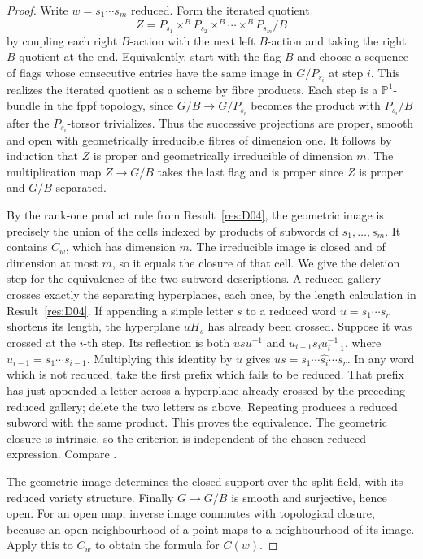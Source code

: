 \documentclass[11pt,a4paper,openany,oneside]{book}
\theoremstyle{resultstyle}
\theoremstyle{definition}
\numberwithin{equation}{chapter}
\begin{document}
\begin{proof}
Write \(w=s_1\cdots s_m\) reduced. Form the iterated quotient
\[
  Z=P_{s_1}\times^B P_{s_2}\times^B\cdots\times^B P_{s_m}/B
\]
by coupling each right \(B\)-action with the next left \(B\)-action and taking the right \(B\)-quotient at the end. Equivalently, start with the flag \(B\) and choose a sequence of flags whose consecutive entries have the same image in \(G/P_{s_i}\) at step \(i\). This realizes the iterated quotient as a scheme by fibre products. Each step is a \(\mathbb P^1\)-bundle in the fppf topology, since \(G/B\to G/P_{s_i}\) becomes the product with \(P_{s_i}/B\) after the \(P_{s_i}\)-torsor trivializes. Thus the successive projections are proper, smooth and open with geometrically irreducible fibres of dimension one. It follows by induction that \(Z\) is proper and geometrically irreducible of dimension \(m\). The multiplication map \(Z\to G/B\) takes the last flag and is proper since \(Z\) is proper and \(G/B\) separated.

By the rank-one product rule from Result~\ref{res:D04}, the geometric image is precisely the union of the cells indexed by products of subwords of \(s_1,\ldots,s_m\). It contains \(C_w\), which has dimension \(m\). The irreducible image is closed and of dimension at most \(m\), so it equals the closure of that cell. We give the deletion step for the equivalence of the two
subword descriptions. A reduced gallery crosses exactly
the separating hyperplanes, each once, by the length
calculation in Result~\ref{res:D04}. If appending a simple
letter \(s\) to a reduced word \(u=s_1\cdots s_r\) shortens
its length, the hyperplane \(uH_s\) has already been crossed.
Suppose it was crossed at the \(i\)-th step. Its reflection
is both \(usu^{-1}\) and \(u_{i-1}s_i u_{i-1}^{-1}\), where
\(u_{i-1}=s_1\cdots s_{i-1}\). Multiplying this identity by
\(u\) gives \(us=s_1\cdots\widehat{s_i}\cdots s_r\).
In any word which is not reduced, take the first prefix
which fails to be reduced. That prefix has just appended
a letter across a hyperplane already crossed by the preceding
reduced gallery; delete the two letters as above. Repeating
produces a reduced subword with the same product.
This proves the equivalence. The geometric closure is
intrinsic, so the criterion is independent of the chosen
reduced expression. Compare \cite[Sections 8.5.4--8.5.6]{springer}.

The geometric image determines the closed support over the split field, with its reduced variety structure. Finally \(G\to G/B\) is smooth and surjective, hence open. For an open map, inverse image commutes with topological closure, because an open neighbourhood of a point maps to a neighbourhood of its image. Apply this to \(C_w\) to obtain the formula for \(C(w)\).
\end{proof}
\end{document}
